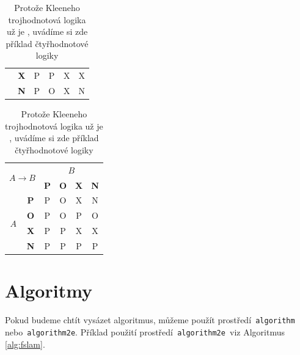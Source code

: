 \documentclass[a4paper, 11pt]{article}
\begin{document}
\begin{table}[h!]
\begin{tabular}{|c|c|c|c|c|c|}
		                                                  & \textbf{X}               & P          & P          & X          & X  \\ \cline{2-6}
		                                                  & \textbf{N}               & P          & O          & X          & N  \\ \cline{2-6}
		\hline
	\end{tabular}
	\begin{tabular}{|c|c|c|c|c|c|}
		\hline
		\multicolumn{2}{|c|}{\multirow{2}{*}{$A \rightarrow B$}} & \multicolumn{4}{c|}{$B$}                                             \\\cline{3-6}
		\multicolumn{2}{|c|}{ }                                  & \textbf{P}               & \textbf{O} & \textbf{X} & \textbf{N}      \\
		\hline
		\multirow{4}{*}{$A$}
		                                                         & \textbf{P}               & P          & O          & X          & N  \\ \cline{2-6}
		                                                         & \textbf{O}               & P          & O          & P          & O  \\ \cline{2-6}
		                                                         & \textbf{X}               & P          & P          & X          & X  \\ \cline{2-6}
		                                                         & \textbf{N}               & P          & P          & P          & P  \\ \cline{2-6}
		\hline
	\end{tabular}

	\caption{Protože Kleeneho trojhodnotová logika už je ,
		uvádíme si zde příklad čtyřhodnotové logiky}
	\label{tab:log}

\end{table}
\bigskip


\pagebreak

\section{Algoritmy}

Pokud budeme chtít vysázet algoritmus, můžeme použít
prostředí\texttt{ algorithm\footnotemark[2] }
nebo\texttt{ algorithm2e\footnotemark[3]}. Příklad použití
prostředí\texttt{ algorithm2e }viz Algoritmus \ref{alg:fslam}.
\end{document}
